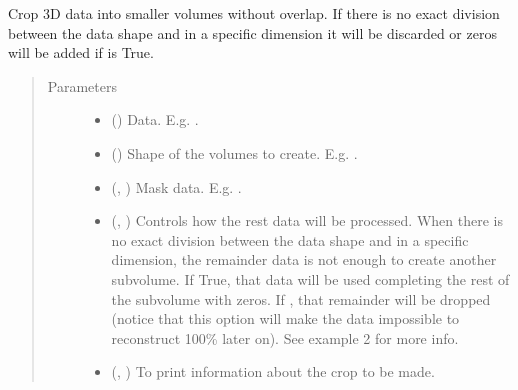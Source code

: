 \documentclass[letterpaper,10pt,english]{sphinxmanual}
\begin{document}
\begin{fulllineitems}
\label{\detokenize{data/data_3d_manipulation:data.data_3D_manipulation.crop_3D_data}}
Crop 3D data into smaller volumes without overlap. If there is no exact division between the data shape and
 in a specific dimension it will be discarded or zeros will be added if  is True.
\begin{quote}\begin{description}
\item[{Parameters}] \leavevmode\begin{itemize}
\item {} 
 () \textendash{} Data. E.g. .

\item {} 
 () \textendash{} Shape of the volumes to create. E.g. .

\item {} 
 (, ) \textendash{} Mask data. E.g. .

\item {} 
 (, ) \textendash{} Controls how the rest data will be processed. When there is no exact division between the data shape and
 in a specific dimension, the remainder data is not enough to create another subvolume. If True,
that data will be used completing the rest of the subvolume with zeros. If , that remainder will be
dropped (notice that this option will make the data impossible to reconstruct 100\% later on). See example 2
for more info.

\item {} 
 (, ) \textendash{} To print information about the crop to be made.


\end{itemize}
\end{description}
\end{quote}
\end{fulllineitems}
\end{document}
